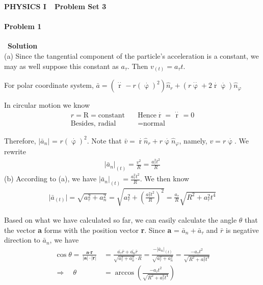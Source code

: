 \documentclass[12pt,a4paper]{article}
\begin{document}
\centerline{\Huge{{\textbf{PHYSICS I\ \ Problem Set 3}}}}
\vspace{0.5cm}
\paragraph{\large \textbf{Problem 1}}~{\textbf{Solution}}
\vspace{2mm}\\
\noindent (a) Since the tangential component of the particle's acceleration is a constant, we may as well suppose this constant as $a_\tau$. Then $v_{(t)} = a_\tau t$.
\par For polar coordinate system, $\bar{a} = (\mathop{r}\limits^{\cdot\cdot}-r(\mathop{\varphi}\limits^\cdot)^2)\hat{n}_r + (r\mathop{\varphi}\limits^{\cdot\cdot}+2\mathop{r}\limits^{\cdot}\mathop{\varphi}\limits^{\cdot})\hat{n}_\varphi$
\par In circular motion we know
\begin{align*}
	r = \text{R} = \text{constant}\quad &\text{Hence} \mathop{r}\limits^{\cdot} = \mathop{r}\limits^{\cdot\cdot} =0 \\
	\text{Besides, radial} &= \text{normal} 
\end{align*}
\par Therefore, $\lvert\bar{a}_n\rvert$ = $r(\mathop{\varphi}\limits^\cdot)^2$. Note that $\bar{v} = \mathop{r}\limits^\cdot\hat{n}_r + r\mathop{\varphi}\limits^\cdot\hat{n}_\varphi$, namely, $v = r\mathop{\varphi}\limits^\cdot$. We rewrite 
\begin{align*}
	\lvert\bar{a}_n\rvert_{(t)} = \frac{v^2}{R} = \frac{a_\tau^2 t^2}{R}
\end{align*}
\noindent (b) According to (a), we have $\lvert\bar{a}_n\rvert_{(t)} =\frac{a_\tau^2 t^2}{R}$. We then know
\begin{align*}
	\lvert\bar{a}_{(t)}\rvert = \sqrt{a_\tau^2 + a_n^2} = \sqrt{a_\tau^2 + (\frac{a_\tau^2 t^2}{R})^2} = \frac{a_\tau}{R} \sqrt{R^2 + a_\tau^2 t^4}
\end{align*}
\par Based on what we have calculated so far, we can easily calculate the angle $\theta$ that the vector \textbf{a} forms with the position vector \textbf{r}. Since \textbf{a} = $\bar{a}_n + \bar{a}_\tau$ and $\bar{r}$ is negative direction to $\bar{a}_n$, we have
\begin{align*}
	\cos\theta = \frac{\textbf{a}\cdot\textbf{r}}{\lvert\textbf{a}\rvert\cdot\lvert\textbf{r}\rvert} &= \frac{\bar{a_\tau}\bar{r} + \bar{a_n}\bar{r}}{\sqrt{a_\tau^2 + a_n^2} \cdot R} = \frac{-\lvert\bar{a}_n\rvert_{(t)}}{\sqrt{a_\tau^2 + a_n^2}} = \frac{-a_\tau t^2}{\sqrt{R^2 + a_{\tau}^2 t^4}}\\
	\Rightarrow \quad
	\theta &= \arccos(\frac{-a_\tau t^2}{\sqrt{R^2 + a_{\tau}^2 t^4}})
\end{align*}
\end{document}

